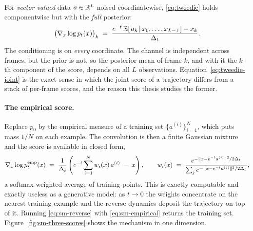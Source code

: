 For \emph{vector-valued} data $a \in \mathbb{R}^{L}$ noised coordinatewise,
\eqref{eq:tweedie} holds componentwise but with the \emph{full} posterior:
\begin{equation}
  \big( \nabla_x \log p_t(x) \big)_k
  \;=\; \frac{e^{-t}\, \mathbb{E}[\,a_k \,|\, x_0, \dots, x_{L-1}\,] - x_k}{\Delta_t}.
  \label{eq:tweedie-joint}
\end{equation}
The conditioning is on \emph{every} coordinate. The channel is independent
across frames, but the prior is not, so the posterior mean of frame $k$, and
with it the $k$-th component of the score, depends on all $L$ observations.
Equation~\eqref{eq:tweedie-joint} is the exact sense in which the joint score
of a trajectory differs from a stack of per-frame scores, and the reason this
thesis studies the former.

\paragraph{The empirical score.} Replace $p_0$ by the empirical measure of a
training set $\{a^{(i)}\}_{i=1}^{N}$, which puts mass $1/N$ on each example.
The convolution is then a finite Gaussian mixture and the score is available in
closed form,
\begin{equation}
  \nabla_x \log p^{\mathrm{emp}}_t(x)
  \;=\; \frac{1}{\Delta_t}\left(
  e^{-t} \sum_{i=1}^{N} w_i(x)\, a^{(i)} \;-\; x \right),
  \qquad
  w_i(x) \;=\; \frac{e^{-\lVert x - e^{-t} a^{(i)}\rVert^2 / 2\Delta_t}}
                    {\sum_{j} e^{-\lVert x - e^{-t} a^{(j)}\rVert^2 / 2\Delta_t}},
  \label{eq:sm-empirical}
\end{equation}
a softmax-weighted average of training points. This is exactly computable and
exactly useless as a generative model: as $t \to 0$ the weights concentrate on
the nearest training example and the reverse dynamics deposit the trajectory on
top of it. Running \eqref{eq:sm-reverse} with \eqref{eq:sm-empirical} returns
the training set. Figure~\ref{fig:sm-three-scores} shows the mechanism in one
dimension.

